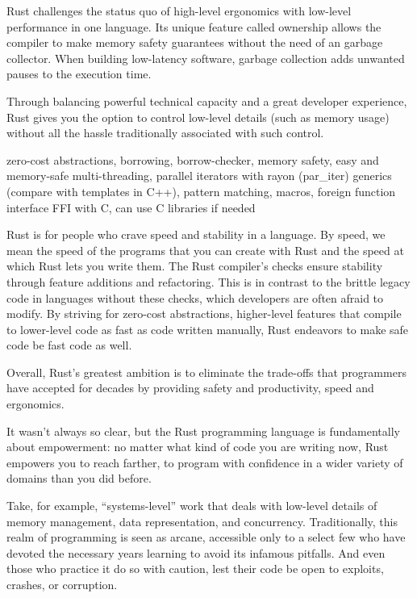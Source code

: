Rust challenges the status quo of high-level ergonomics with low-level performance in one language. Its unique feature called ownership allows the compiler to make memory safety guarantees without the need of an garbage collector. When building low-latency software, garbage collection adds unwanted pauses to the execution time. 

Through balancing powerful technical capacity and a great developer experience, Rust gives you the option to control low-level details (such as memory usage) without all the hassle traditionally associated with such control. \cite{steveklabnik2018}

zero-cost abstractions, borrowing, borrow-checker, memory safety, easy and memory-safe multi-threading, parallel iterators with rayon (par\_iter) generics (compare with templates in C++), pattern matching, macros, foreign function interface FFI with C, can use C libraries if needed


Rust is for people who crave speed and stability in a language. By speed, we mean the speed of the programs that you can create with Rust and the speed at which Rust lets you write them. The Rust compiler’s checks ensure stability through feature additions and refactoring. This is in contrast to the brittle legacy code in languages without these checks, which developers are often afraid to modify. By striving for zero-cost abstractions, higher-level features that compile to lower-level code as fast as code written manually, Rust endeavors to make safe code be fast code as well. \cite{steveklabnik2018}

Overall, Rust’s greatest ambition is to eliminate the trade-offs that programmers have accepted for decades by providing safety and productivity, speed and ergonomics. \cite{steveklabnik2018}

It wasn’t always so clear, but the Rust programming language is fundamentally about empowerment: no matter what kind of code you are writing now, Rust empowers you to reach farther, to program with confidence in a wider variety of domains than you did before.

Take, for example, “systems-level” work that deals with low-level details of memory management, data representation, and concurrency. Traditionally, this realm of programming is seen as arcane, accessible only to a select few who have devoted the necessary years learning to avoid its infamous pitfalls. And even those who practice it do so with caution, lest their code be open to exploits, crashes, or corruption.

